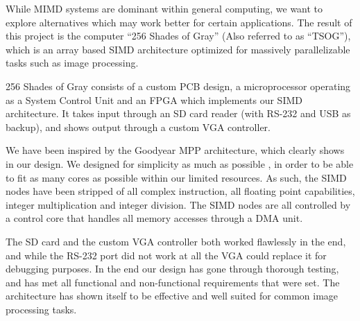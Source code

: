 While MIMD systems are dominant within general computing, we want to explore
alternatives which may work better for certain applications. The result of this
project is the computer ``256 Shades of Gray'' (Also referred to as
``TSOG''), which is
an array based SIMD architecture optimized for massively parallelizable tasks
such as image processing.

256 Shades of Gray consists of a custom PCB design, a microprocessor operating
as a System Control Unit and an FPGA which implements our SIMD architecture. It
takes input through an SD card reader (with RS-232 and USB as
backup), and shows output
through a custom VGA controller.

We have been inspired by the Goodyear MPP architecture, which clearly shows in
our design. We designed for simplicity as much as possible , in
order to be able to fit as many cores as possible within our limited
resources. As such, the SIMD nodes have been stripped of all complex
instruction, all floating point capabilities, integer multiplication and integer
division. The SIMD nodes are all controlled by a control core that handles all
memory accesses through a DMA unit.

The SD card and the custom VGA controller both worked flawlessly in the
end, and while the RS-232 port did not work at
all the VGA could replace it for debugging purposes. In the end our design has
gone through thorough testing, and has met all functional and non-functional
requirements that were set. The architecture has shown itself to be effective
and well suited for common image processing tasks.
\endgroup
